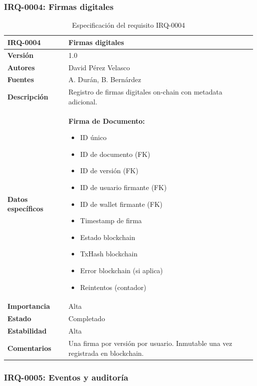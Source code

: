 \documentclass[11pt, a4paper]{article}
\begin{document}
\subsubsection{IRQ-0004: Firmas digitales}

\begin{table}[H]
    \centering
    \small
    \begin{tabular}{|p{4cm}|p{10cm}|}
    \hline
    \textbf{IRQ-0004} & Firmas digitales \\
    \hline
    \textbf{Versión} & 1.0 \\
    \hline
    \textbf{Autores} & David Pérez Velasco \\
    \hline
    \textbf{Fuentes} & A. Durán, B. Bernárdez \\
    \hline
    \textbf{Descripción} & Registro de firmas digitales on-chain con metadata adicional. \\
    \hline
    \textbf{Datos específicos} & 
    \textbf{Firma de Documento:}
    \begin{itemize}
        \item ID único
        \item ID de documento (FK)
        \item ID de versión (FK)
        \item ID de usuario firmante (FK)
        \item ID de wallet firmante (FK)
        \item Timestamp de firma
        \item Estado blockchain
        \item TxHash blockchain
        \item Error blockchain (si aplica)
        \item Reintentos (contador)
    \end{itemize} \\
    \hline
    \textbf{Importancia} & Alta \\
    \hline
    \textbf{Estado} & Completado \\
    \hline
    \textbf{Estabilidad} & Alta \\
    \hline
    \textbf{Comentarios} & Una firma por versión por usuario. Inmutable una vez registrada en blockchain. \\
    \hline
    \end{tabular}
    \caption{Especificación del requisito IRQ-0004}
\end{table}

\subsubsection{IRQ-0005: Eventos y auditoría}
\end{document}
